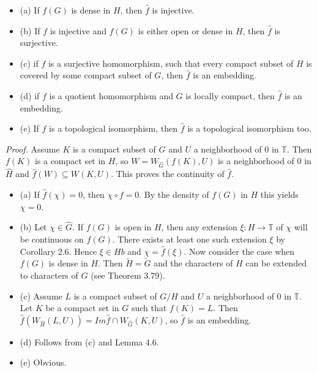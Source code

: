 \documentclass[12pt]{article}
\begin{document}
\begin{itemize}

    \item (a) If $f(G)$ is dense in $H$, then $\hat{f}$ is injective.

    \item (b) If $f$ is injective and $f(G)$ is either open or dense in $H$, then $\hat{f}$ is surjective.

    \item (c) if $f$ is a surjective homomorphism, such that every compact subset of $H$ is covered by some compact subset
    of $G$, then $\hat{f}$ is an embedding.

    \item (d) if $f$ is a quotient homomorphism and $G$ is locally compact, then $\hat{f}$ is an embedding.

    \item (e) If $f$ is a topological isomorphism, then $\hat{f}$ is a topological isomorphism too.

\end{itemize}


\emph{Proof.} Assume $K$ is a compact subset of $G$ and $U$ a neighborhood of 0 in $\mathbb{T}$. Then $f(K)$ is a compact set in $H$,
so $W = W_{\hat{G}}(f(K), U)$ is a neighborhood of 0 in $\hat{H}$ and $\hat{f}(W) \subseteq W(K, U)$. This proves the continuity of $\hat{f}$.


\begin{itemize}

    \item (a) If $\hat{f}(\chi) = 0$, then $\chi \circ f = 0$. By the density of $f(G)$ in $H$ this yields $\chi = 0$.

    \item (b) Let $\chi \in \hat{G}$. If $f(G)$ is open in $H$, then any extension $\xi : H \to \mathbb{T}$ of $\chi$ will be continuous on $f(G)$. There
    exists at least one such extension $\xi$ by Corollary 2.6. Hence $\xi \in Hb$ and $\chi = \hat{f}(\xi)$. Now consider the case
    when $f(G)$ is dense in $H$. Then $\tilde{H} = \tilde{G}$ and the characters of $H$ can be extended to characters of $G$ (see
    Theorem 3.79).

    \item (c) Assume $L$ is a compact subset of $G/H$ and $U$ a neighborhood of 0 in $\mathbb{T}$. Let $K$ be a compact set in $G$
    such that $f(K) = L$. Then $\hat{f}(W_{\hat{H}} (L, U)) = Im \hat{f} \cap W_{\hat{G}} (K, U)$, so $\hat{f}$ is an embedding.    

    \item (d) Follows from (c) and Lemma 4.6.

    \item (e) Obvious.

\end{itemize}
\end{document}
